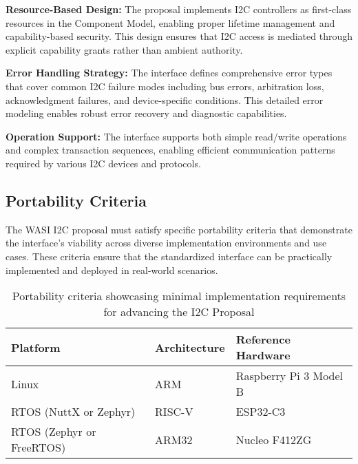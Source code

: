 
\textbf{Resource-Based Design:} The proposal implements I2C controllers as first-class resources in the Component Model, enabling proper lifetime management and capability-based security. This design ensures that I2C access is mediated through explicit capability grants rather than ambient authority.

\textbf{Error Handling Strategy:} The interface defines comprehensive error types that cover common I2C failure modes including bus errors, arbitration loss, acknowledgment failures, and device-specific conditions. This detailed error modeling enables robust error recovery and diagnostic capabilities.

\textbf{Operation Support:} The interface supports both simple read/write operations and complex transaction sequences, enabling efficient communication patterns required by various I2C devices and protocols.

\subsection{Portability Criteria}
\label{subsec:i2c-portability}

The WASI I2C proposal must satisfy specific portability criteria that demonstrate the interface's viability across diverse implementation environments and use cases. These criteria ensure that the standardized interface can be practically implemented and deployed in real-world scenarios.

\begin{table}[h]
	\centering
	\captionsetup{justification=centering}
	\caption{Portability criteria showcasing minimal implementation requirements for advancing the I2C Proposal}
	\label{tab:portability_criteria}
	\begin{tabular}{lll}
		\toprule
		\textbf{Platform} & \textbf{Architecture} & \textbf{Reference Hardware} \\
        \midrule
		Linux & ARM & Raspberry Pi 3 Model B \\
		RTOS (NuttX or Zephyr) & RISC-V & ESP32-C3 \\
        RTOS (Zephyr or FreeRTOS) & ARM32 & Nucleo F412ZG \\
		\bottomrule
	\end{tabular}
\end{table}

